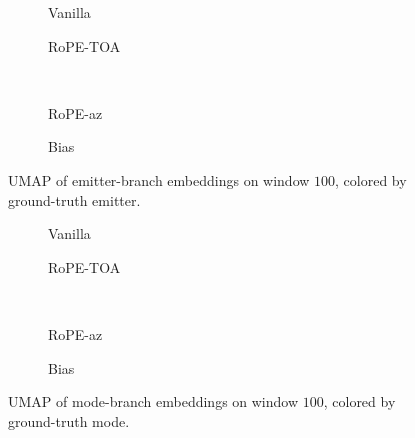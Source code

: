 \begin{figure}[tbp]
  \centering
  \begin{subfigure}[t]{0.48\linewidth}
    \centering
    \caption{Vanilla}
    \label{fig:exp:emb_w100_em:vanilla}
  \end{subfigure}
  \hfill
  \begin{subfigure}[t]{0.48\linewidth}
    \centering
    \caption{RoPE-TOA}
    \label{fig:exp:emb_w100_em:rope_toa}
  \end{subfigure}\\[0.8em]
  \begin{subfigure}[t]{0.48\linewidth}
    \centering
    \caption{RoPE-az}
    \label{fig:exp:emb_w100_em:rope_az}
  \end{subfigure}
  \hfill
  \begin{subfigure}[t]{0.48\linewidth}
    \centering
    \caption{Bias}
    \label{fig:exp:emb_w100_em:bias}
  \end{subfigure}
  \caption{UMAP of emitter-branch embeddings on window $100$, colored by ground-truth emitter.}
  \label{fig:exp:emb_w100_em}
\end{figure}

\begin{figure}[tbp]
  \centering
  \begin{subfigure}[t]{0.48\linewidth}
    \centering
    \caption{Vanilla}
    \label{fig:exp:emb_w100_md:vanilla}
  \end{subfigure}
  \hfill
  \begin{subfigure}[t]{0.48\linewidth}
    \centering
    \caption{RoPE-TOA}
    \label{fig:exp:emb_w100_md:rope_toa}
  \end{subfigure}\\[0.8em]
  \begin{subfigure}[t]{0.48\linewidth}
    \centering
    \caption{RoPE-az}
    \label{fig:exp:emb_w100_md:rope_az}
  \end{subfigure}
  \hfill
  \begin{subfigure}[t]{0.48\linewidth}
    \centering
    \caption{Bias}
    \label{fig:exp:emb_w100_md:bias}
  \end{subfigure}
  \caption{UMAP of mode-branch embeddings on window $100$, colored by ground-truth mode.}
  \label{fig:exp:emb_w100_md}
\end{figure}
